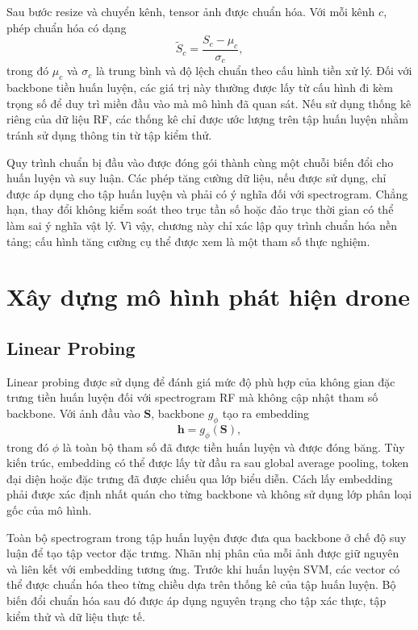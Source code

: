 \documentclass[../DoAn.tex]{subfiles}
\begin{document}
Sau bước resize và chuyển kênh, tensor ảnh được chuẩn hóa. Với mỗi kênh $c$, phép chuẩn hóa có dạng
\begin{equation}
    \widetilde{S}_{c}
    =
    \frac{S_{c}-\mu_c}{\sigma_c},
\end{equation}
trong đó $\mu_c$ và $\sigma_c$ là trung bình và độ lệch chuẩn theo cấu hình tiền xử lý. Đối với backbone tiền huấn luyện, các giá trị này thường được lấy từ cấu hình đi kèm trọng số để duy trì miền đầu vào mà mô hình đã quan sát. Nếu sử dụng thống kê riêng của dữ liệu RF, các thống kê chỉ được ước lượng trên tập huấn luyện nhằm tránh sử dụng thông tin từ tập kiểm thử.

Quy trình chuẩn bị đầu vào được đóng gói thành cùng một chuỗi biến đổi cho huấn luyện và suy luận. Các phép tăng cường dữ liệu, nếu được sử dụng, chỉ được áp dụng cho tập huấn luyện và phải có ý nghĩa đối với spectrogram. Chẳng hạn, thay đổi không kiểm soát theo trục tần số hoặc đảo trục thời gian có thể làm sai ý nghĩa vật lý. Vì vậy, chương này chỉ xác lập quy trình chuẩn hóa nền tảng; cấu hình tăng cường cụ thể được xem là một tham số thực nghiệm.

\section{Xây dựng mô hình phát hiện drone}

\subsection{Linear Probing}

Linear probing được sử dụng để đánh giá mức độ phù hợp của không gian đặc trưng tiền huấn luyện đối với spectrogram RF mà không cập nhật tham số backbone. Với ảnh đầu vào $\mathbf{S}$, backbone $g_{\phi}$ tạo ra embedding
\begin{equation}
    \mathbf{h}=g_{\phi}(\mathbf{S}),
\end{equation}
trong đó $\phi$ là toàn bộ tham số đã được tiền huấn luyện và được đóng băng. Tùy kiến trúc, embedding có thể được lấy từ đầu ra sau global average pooling, token đại diện hoặc đặc trưng đã được chiếu qua lớp biểu diễn. Cách lấy embedding phải được xác định nhất quán cho từng backbone và không sử dụng lớp phân loại gốc của mô hình.

Toàn bộ spectrogram trong tập huấn luyện được đưa qua backbone ở chế độ suy luận để tạo tập vector đặc trưng. Nhãn nhị phân của mỗi ảnh được giữ nguyên và liên kết với embedding tương ứng. Trước khi huấn luyện SVM, các vector có thể được chuẩn hóa theo từng chiều dựa trên thống kê của tập huấn luyện. Bộ biến đổi chuẩn hóa sau đó được áp dụng nguyên trạng cho tập xác thực, tập kiểm thử và dữ liệu thực tế.
\end{document}
